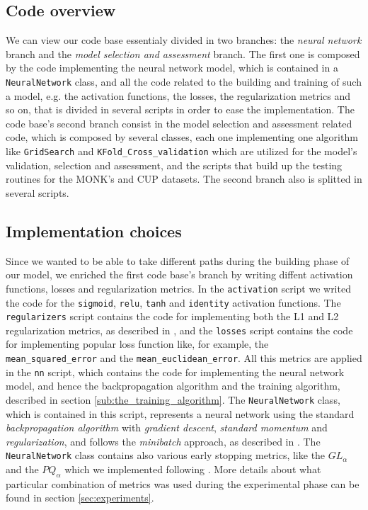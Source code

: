 \documentclass[11pt,twoside]{article}
\begin{document}
    \subsection{Code overview} %
    \label{sub:code_overview}
        We can view our code base essentialy divided in two branches: the \textit{neural network} branch and
        the \textit{model selection and assessment} branch. The first one is composed by the code implementing the
        neural network model, which is contained in a \texttt{NeuralNetwork} class, and all the code related
        to the building and training of such a model, e.g. the activation functions, the losses, the
        regularization metrics and so on, that is divided in several scripts in order to ease the implementation.
        The code base's second branch consist in the model selection and assessment related code, which is
        composed by several classes, each one implementing one algorithm like \texttt{GridSearch} and
        \texttt{KFold\_Cross\_validation} which are utilized for the model's validation, selection and
        assessment, and the scripts that build up the testing routines for the MONK's and CUP datasets.
        The second branch also is splitted in several scripts.

    \subsection{Implementation choices} %
    \label{sub:implementation_choices}
        Since we wanted to be able to take different paths during the building phase of our model, we enriched
        the first code base's branch by writing diffent activation functions, losses and regularization metrics.
        In the \texttt{activation} script we writed the code for the \texttt{sigmoid}, \texttt{relu},
        \texttt{tanh} and \texttt{identity} activation functions. The \texttt{regularizers} script contains the
        code for implementing both the L1 and L2 regularization metrics, as described in \cite{deep_learning},
        and the \texttt{losses} script contains the code for implementing popular loss function like, for
        example, the \texttt{mean\_squared\_error} and the \texttt{mean\_euclidean\_error}. All this metrics
        are applied in the \texttt{nn} script, which contains the code for implementing the neural
        network model, and hence the backpropagation algorithm and the training algorithm, described in section
        \ref{sub:the_training_algorithm}. The \texttt{NeuralNetwork} class, which is contained in this script,
        represents a neural network using the standard \textit{backpropagation algorithm} with
        \textit{gradient descent}, \textit{standard momentum} and \textit{regularization}, and follows the
        \textit{minibatch} approach, as described in \cite{deep_learning}. The \texttt{NeuralNetwork} class
        contains also various early stopping metrics, like the $GL_{\alpha}$ and the $PQ_{\alpha}$ which we
        implemented following \cite{early_stopping}. More details about what particular combination of
        metrics was used during the experimental phase can be found in section \ref{sec:experiments}.
\end{document}
